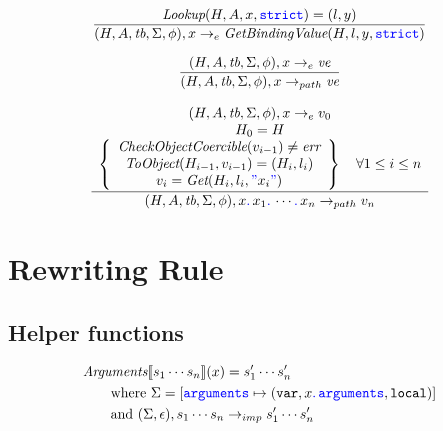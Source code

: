 \documentclass[a4paper]{article}
\newcommand{\code}[1]{\textcolor{blue}{\tt #1}}
\newcommand{\mydot}{.\,}
\newcommand{\var}{{\tt{var}}}
\newcommand{\local}{{\tt{local}}}
\newcommand{\Where}{\mbox{where}}
\newcommand{\tb}{\emph{tb}}
\begin{document}
\begin{equation*}
\frac{
    \emph{Lookup} (H, A, x, \code{strict}) = (l, y)
}{
    (H, A, \tb, \Sigma, \phi), x \rightarrow_e \emph{GetBindingValue} (H, l, y, \code{strict})
}
\end{equation*}

\begin{equation*}
\frac{
    (H, A, \tb, \Sigma, \phi), x \rightarrow_e \emph{ve}
}{
    (H, A, \tb, \Sigma, \phi), x \rightarrow_{path} \emph{ve}
}
\end{equation*}

\begin{equation*}
\frac{
    \begin{array}{c}
    (H, A, \tb, \Sigma, \phi), x \rightarrow_e v_0 \\
    H_0 = H \\
    \left\{\begin{array}{c}
    \emph{CheckObjectCoercible} (v_{i-1}) \ne \emph{err} \\
    \emph{ToObject} (H_{i-1}, v_{i-1}) = (H_i, l_i) \\
    v_i = \emph{Get} (H_i, l_i, \code{"}x_i\code{"})
    \end{array}\right\} \quad \forall 1 \le i \le n \\
    \end{array}
}{
    (H, A, \tb, \Sigma, \phi), x \code{\mydot} x_1 \code{\mydot} \cdots \code{\mydot} x_n \rightarrow_{path} v_n
}
\end{equation*}

\section{Rewriting Rule}
\subsection{Helper functions}
\begin{equation*}
\begin{split}
& \emph{Arguments} \llbracket s_1 \cdots s_n \rrbracket (x) = s'_1 \cdots s'_n \\
&\qquad \Where\ \Sigma =  [\code{arguments} \mapsto (\var, x \code{\mydot arguments}, \local)] \\
&\qquad \mbox{and}\ (\Sigma, \epsilon), s_1 \cdots s_n \rightarrow_{imp} s'_1 \cdots s'_n \\
\end{split}
\end{equation*}
\end{document}
